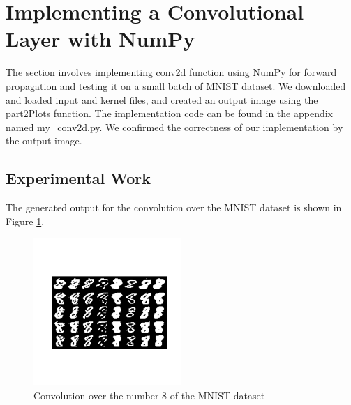 \documentclass[3p,times,procedia]{elsarticle}
\begin{document}

\section{\textbf{Implementing a Convolutional Layer with NumPy}}

The section involves implementing conv2d function using NumPy for forward propagation and testing it on a small batch of MNIST dataset.
We downloaded and loaded input and kernel files, and created an output image using the part2Plots function.
The implementation code can be found in the appendix named my\_conv2d.py.
We confirmed the correctness of our implementation by the output image.






\subsection{\textbf{Experimental Work}}
The generated output for the convolution over the MNIST dataset is shown in Figure \ref{fig:output}.



\begin{figure}[H]
    \centering
    \includegraphics[width=0.5\textwidth, trim={0 5cm 0 5cm}]{figures/output.png}
    \caption{Convolution over the number 8 of the MNIST dataset}
    \label{fig:output}
\end{figure}
\end{document}
